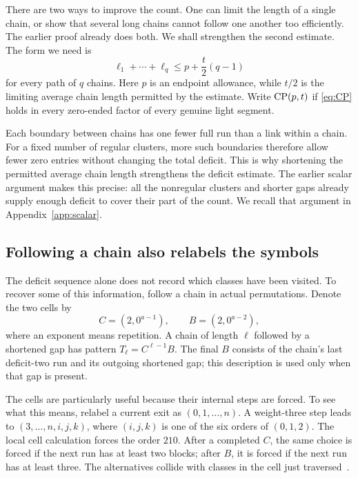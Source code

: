 There are two ways to improve the count. One can limit the length of
a single chain, or show that several long chains cannot follow one
another too efficiently. The earlier proof already does both. We shall
strengthen the second estimate. The form we need is
\begin{equation}\label{eq:CP}
 \ell_1+\cdots+\ell_q\le p+\frac t2(q-1)
\end{equation}
for every path of $q$ chains. Here $p$ is an endpoint allowance, while
$t/2$ is the limiting average chain length permitted by the estimate.
Write $\operatorname{CP}(p,t)$ if \eqref{eq:CP} holds in every zero-ended factor of
every genuine light segment.

Each boundary between chains has one fewer full run than a link within
a chain. For a fixed number of regular clusters, more such boundaries
therefore allow fewer zero entries without changing the total deficit.
This is why shortening the permitted average chain length strengthens
the deficit estimate. The earlier scalar argument makes this precise: all the nonregular clusters
and shorter gaps already supply enough deficit to cover their part of
the count. We recall that argument in Appendix~\ref{app:scalar}.

\subsection{Following a chain also relabels the symbols}

The deficit sequence alone does not record which classes have been
visited. To recover some of this information, follow a chain in actual
permutations. Denote the two cells by
\[
 C=(2,0^{a-1}),\qquad B=(2,0^{a-2}),
\]
where an exponent means repetition. A chain of length $\ell$ followed
by a shortened gap has pattern $T_\ell=C^{\ell-1}B$. The final $B$
consists of the chain's last deficit-two run and its outgoing shortened
gap; this description is used only when that gap is present.

The cells are particularly useful because their internal steps are
forced. To see what this means, relabel a current exit as
$(0,1,\ldots,n)$. A weight-three step leads to $(3,\ldots,n,i,j,k)$,
where $(i,j,k)$ is one of the six orders of $(0,1,2)$. The local cell
calculation forces the order $210$. After a completed $C$, the same
choice is forced if the next run has at least two blocks; after $B$,
it is forced if the next run has at least three. The alternatives
collide with classes in the cell just traversed~\cite{pantone-framework}.


